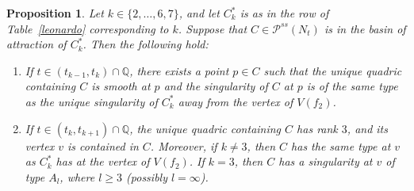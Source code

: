 \documentclass[11pt]{amsart}
\numberwithin{equation}{section}
\theoremstyle{plain}
\newtheorem{proposition}[theorem]{Proposition}
\theoremstyle{remark}
\theoremstyle{definition}
\newcommand{\cP}{{\mathscr P}}
\newcommand{\QQ}{{\mathbb Q}}
\begin{document}
%
\begin{proposition}\label{prp:basintk}
%
Let  $k\in\{2,\ldots,6,7\}$, and let $C^{*}_k$ is as in the row of Table~\ref{leonardo} corresponding to $k$. Suppose that   $C\in\cP^{ss}(N_t)$ is in the basin of attraction of $C^{*}_k$. Then the following hold:
%
\begin{enumerate}
%
\item
%
If $t\in (t_{k-1},t_k)\cap\QQ$,   there exists a point $p\in C$  such that the unique quadric containing $C$ is smooth  at $p$ and the singularity of $C$ at $p$ is of the same type as the unique singularity of $C_k^{*}$ away from the vertex of $V(f_2)$. 
%
\item
%
If $t\in (t_{k},t_{k+1})\cap\QQ$,  the unique quadric containing $C$ has rank $3$, and its vertex $v$ is contained in $C$. Moreover, if $k\not=3$, then  $C$ has the same type at $v$  as $C^{*}_k$ has at the vertex of $V(f_2)$. If $k=3$, then   $C$ has a singularity at $v$ of type $A_l$, where $l\ge 3$ (possibly $l=\infty$). 
% 
\end{enumerate}
%
%
\end{proposition}
%
\end{document}
